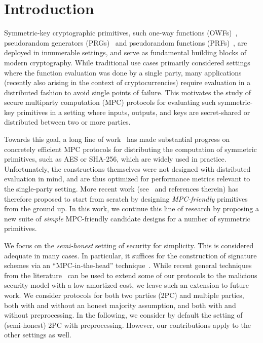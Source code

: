 
\section{Introduction}
\label{sec:introduction}

Symmetric-key cryptographic primitives, such one-way functions (OWFs)~\cite{levin1985-owf}, pseudorandom generators (PRGs)~\cite{blum1984-prg,yao1982-prg} and pseudorandom functions (PRFs)~\cite{goldreich1984-prf}, are deployed in innumerable settings, and serve as fundamental building blocks of modern cryptography. While traditional use cases primarily considered settings where the function evaluation was done by a single party, many applications (recently also arising in the context of cryptocurrencies) require evaluation in a distributed fashion to avoid single points of failure. This motivates the study of secure multiparty computation (MPC) protocols for evaluating such symmetric-key primitives in a setting where inputs, outputs, and keys are secret-shared or distributed between two or more parties.

Towards this goal, a long line of work~\cite{damgard2010-aes,pinkas2009-aes,wang2017-mpc} has made substantial progress on concretely efficient MPC protocols for distributing the computation of symmetric primitives, such as AES or SHA-256, which are widely used in practice. Unfortunately, the constructions themselves were not designed with distributed evaluation in mind, and are thus optimized for performance metrics relevant to the single-party setting. More recent work (see~\cite{albrecht2015-lowmc,grassi2016-mpcfriendly,boneh2018-darkmatter,albrecht2019-feistal-mpc,aly2020-design-mpc} and references therein) has therefore proposed to start from scratch by designing \textit{MPC-friendly} primitives from the ground up. In this work, we continue this line of research by proposing a new suite of \textit{simple} MPC-friendly candidate designs for a number of symmetric primitives.

We focus on the {\em semi-honest} setting of security for simplicity. This is considered adequate in many cases. In particular, it suffices for the construction of signature schemes via an ``MPC-in-the-head'' technique~\cite{ishai2007-zkmpc,chase2017-picnic}.
While recent general techniques from the literature~\cite{BBCGI19,BGIN19} can be used to extend some of our protocols to the malicious security model with a low amortized cost, we leave such an extension to future work. We consider protocols for both two parties (2PC) and multiple parties, both with and without an honest majority assumption, and both with and without preprocessing. In the following, we consider by default the setting of (semi-honest) 2PC with preprocessing. However, our contributions apply to the other settings as well.

